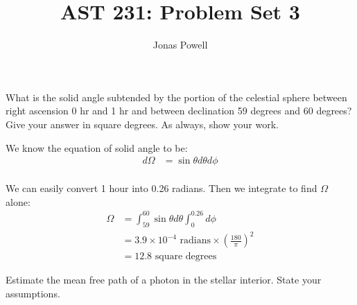 \documentclass[12pt]{article}
\newenvironment{problem}[2][Problem]{\begin{trivlist}
\item[\hskip \labelsep {\bfseries #1}\hskip \labelsep {\bfseries #2.}]}{\end{trivlist}}
\newenvironment{answer}[2][Answer]{\begin{trivlist}
\item[\hskip \labelsep {\bfseries #1}\hskip \labelsep {\bfseries #2.}]}{\end{trivlist}}
\begin{document}

\title{AST 231: Problem Set 3}
\author{Jonas Powell}
\maketitle


\iffalse
\begin{problem}{1}
What is the solid angle subtended by the portion of the celestial sphere between right ascension 0 hr and 1 hr and between declination 59 degrees and 60 degrees? Give your answer in square degrees. As always, show your work.
\end{problem}

\begin{answer}{1}

We know the equation of solid angle to be:
\begin{align*}
  d \Omega &= \sin{\theta} d\theta d\phi \\
\end{align*}

We can easily convert 1 hour into 0.26 radians. Then we integrate to find $\Omega$ alone:
\begin{align*}
  \Omega &= \int_{59} ^{60} \sin{\theta} d\theta \int_{0} ^{0.26} d\phi \\
         &= 3.9 \times 10^{-4} \text{ radians} \times (\frac{180}{\pi})^2 \\
         &= 12.8 \text{ square degrees}
\end{align*}





\end{answer}





\begin{problem}{2}

Estimate the mean free path of a photon in the stellar interior. State your assumptions.

\end{problem}
\end{document}
